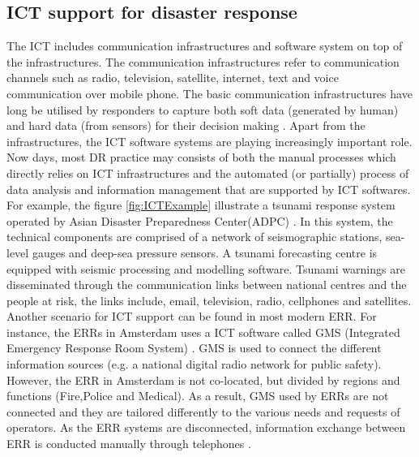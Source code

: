 \subsection{ICT support for disaster response}
The \acf{ICT} includes communication infrastructures and software system on top of the infrastructures. The communication infrastructures refer to communication channels such as radio, television, satellite, internet, text and voice communication over mobile phone. The basic communication infrastructures have long be utilised by responders to capture both soft data (generated by human) and hard data (from sensors) for their decision making \cite{Fischer2012}. Apart from the infrastructures, the \ac{ICT} software systems are playing increasingly important role. Now days, most DR practice may consists  of both the manual processes which directly relies on \ac{ICT} infrastructures and the automated (or partially) process of data analysis and information management that are supported by \ac{ICT} softwares. For example, the figure \ref{fig:ICTExample} illustrate a tsunami response system operated by Asian Disaster Preparedness Center(ADPC) \cite{Wattegama2012}. In this system,  the technical components are comprised of a network of seismographic stations, sea-level gauges and deep-sea pressure sensors. A tsunami forecasting centre is equipped with seismic processing and modelling software.  Tsunami warnings are disseminated through the communication links between national centres and the people at risk, the links include, email, television, radio, cellphones and satellites. Another scenario for \ac{ICT} support can be found in most modern \acf{ERR}. For instance, the ERRs in Amsterdam uses a \ac{ICT} software called GMS (Integrated Emergency Response Room System) \cite{Boersma2009}. GMS is used to connect the different information sources (e.g. a national digital radio network for public safety). However, the \ac{ERR} in Amsterdam is not co-located, but divided by regions and functions (Fire,Police and Medical). As a result, GMS used by \acf{ERR}s are not connected and they are tailored differently to the various needs and requests of operators. As the \acf{ERR} systems are disconnected, information exchange between \ac{ERR} is conducted manually through telephones \cite{Boersma2009}.\\


